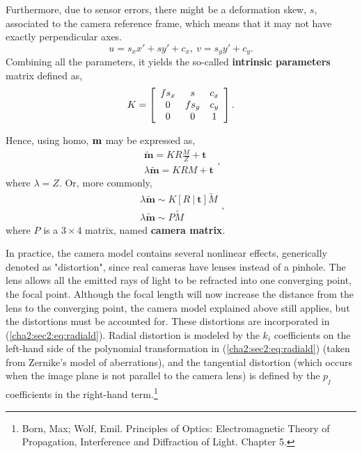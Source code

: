\begin{enumerate}
	Furthermore, due to sensor errors, there might be a deformation skew, $s$, associated to the camera reference frame, which means that it may not have exactly perpendicular axes.
	\begin{equation}
	\label{cha2:sec2:eq:trisimilar}
	u = s_x x' + sy' + c_x, \ v = s_y y' + c_y.
	\end{equation}
	Combining all the parameters, it yields the so-called \textbf{intrinsic parameters} matrix defined as,
	\begin{equation}
	\label{sec2:eq:kmatrix}
	K = \left[ 
	\begin{array} { c c c } 
	f s_x & s     & c_x \\ 
	0 	  & f s_y & c_y \\ 
	0     & 0     & 1   
	\end{array} 
	\right].
	\end{equation}
\end{enumerate}
Hence, using \gls{homo}, $\bf m$ may be expressed as,
\begin{equation}
\begin{array} { l } 
\mathbf{\widetilde{m}} = K R \frac{M}{Z} + \mathbf{t} \\
\lambda \mathbf{\widetilde{m}} = KR M +  \mathbf{t} 
\end{array},
\end{equation}
where $\lambda = Z$. Or, more commonly, 
\begin{equation}
\begin{array} { l } { \lambda \mathbf{\widetilde{m}} \sim K [ R \ | \ \mathbf{t} ] \widetilde { M } } \\ { \lambda \mathbf{\widetilde{ m }} \sim P \widetilde { M } } \end{array},
\end{equation}
where $P$ is a $3\times4$ matrix, named \textbf{camera matrix}.
	
In practice, the camera model contains several nonlinear effects, generically denoted as "distortion", since real cameras have lenses instead of a pinhole. The lens allows all the emitted rays of light to be refracted into one converging point, the focal point. Although the focal length will now increase the distance from the lens to the converging point, the camera model explained above still applies, but the distortions must be accounted for. These distortions are incorporated in (\ref{cha2:sec2:eq:radiald}). Radial distortion is modeled by the $k_i$ coefficients on the left-hand side of the polynomial transformation in (\ref{cha2:sec2:eq:radiald}) (taken from Zernike's model of aberrations), and the tangential distortion (which occurs when the image plane is not parallel to the camera lens) is defined by the $p_j$ coefficients in the right-hand term.\footnote{Born, Max; Wolf, Emil. Principles of Optics: Electromagnetic Theory of Propagation, Interference and Diffraction of Light. Chapter 5.} 

